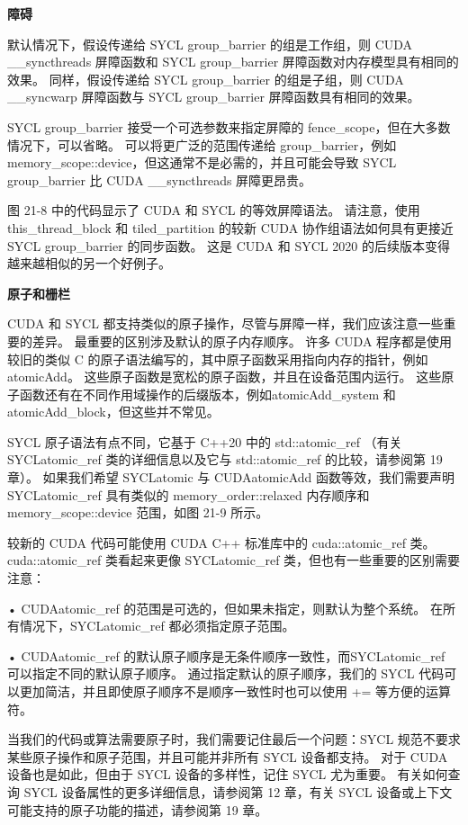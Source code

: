 \textbf{障碍}

默认情况下，假设传递给 SYCL group\_barrier 的组是工作组，则 CUDA \_\_syncthreads 屏障函数和 SYCL group\_barrier 屏障函数对内存模型具有相同的效果。 同样，假设传递给 SYCL group\_barrier 的组是子组，则 CUDA \_\_syncwarp 屏障函数与 SYCL group\_barrier 屏障函数具有相同的效果。

SYCL group\_barrier 接受一个可选参数来指定屏障的 fence\_scope，但在大多数情况下，可以省略。 可以将更广泛的范围传递给 group\_barrier，例如 memory\_scope::device，但这通常不是必需的，并且可能会导致 SYCL group\_barrier 比 CUDA \_\_syncthreads 屏障更昂贵。

图 21-8 中的代码显示了 CUDA 和 SYCL 的等效屏障语法。 请注意，使用 this\_thread\_block 和 tiled\_partition 的较新 CUDA 协作组语法如何具有更接近 SYCL group\_barrier 的同步函数。 这是 CUDA 和 SYCL 2020 的后续版本变得越来越相似的另一个好例子。

\textbf{原子和栅栏}

CUDA 和 SYCL 都支持类似的原子操作，尽管与屏障一样，我们应该注意一些重要的差异。 最重要的区别涉及默认的原子内存顺序。 许多 CUDA 程序都是使用较旧的类似 C 的原子语法编写的，其中原子函数采用指向内存的指针，例如atomicAdd。 这些原子函数是宽松的原子函数，并且在设备范围内运行。 这些原子函数还有在不同作用域操作的后缀版本，例如atomicAdd\_system 和atomicAdd\_block，但这些并不常见。

SYCL 原子语法有点不同，它基于 C++20 中的 std::atomic\_ref （有关 SYCLatomic\_ref 类的详细信息以及它与 std::atomic\_ref 的比较，请参阅第 19 章）。 如果我们希望 SYCLatomic 与 CUDAatomicAdd 函数等效，我们需要声明 SYCLatomic\_ref 具有类似的 memory\_order::relaxed 内存顺序和 memory\_scope::device 范围，如图 21-9 所示。

较新的 CUDA 代码可能使用 CUDA C++ 标准库中的 cuda::atomic\_ref 类。 cuda::atomic\_ref 类看起来更像 SYCLatomic\_ref 类，但也有一些重要的区别需要注意：

• CUDAatomic\_ref 的范围是可选的，但如果未指定，则默认为整个系统。 在所有情况下，SYCLatomic\_ref 都必须指定原子范围。

• CUDAatomic\_ref 的默认原子顺序是无条件顺序一致性，而SYCLatomic\_ref 可以指定不同的默认原子顺序。 通过指定默认的原子顺序，我们的 SYCL 代码可以更加简洁，并且即使原子顺序不是顺序一致性时也可以使用 += 等方便的运算符。

当我们的代码或算法需要原子时，我们需要记住最后一个问题：SYCL 规范不要求某些原子操作和原子范围，并且可能并非所有 SYCL 设备都支持。 对于 CUDA 设备也是如此，但由于 SYCL 设备的多样性，记住 SYCL 尤为重要。 有关如何查询 SYCL 设备属性的更多详细信息，请参阅第 12 章，有关 SYCL 设备或上下文可能支持的原子功能的描述，请参阅第 19 章。

